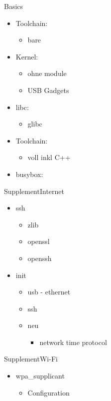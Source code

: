 \begin{frame}{Basics}
 \begin{itemize}
  \item Toolchain: 
  \begin{itemize}
   \item bare
  \end{itemize}
  \item Kernel:
  \begin{itemize}
   \item ohne module
   \item USB Gadgets
  \end{itemize}
  \item libc:
  \begin{itemize}
   \item glibc
  \end{itemize}
  \item Toolchain: 
  \begin{itemize}
   \item voll inkl C++
  \end{itemize}
  \item busybox:
 \end{itemize}
\end{frame}

\begin{frame}{Supplement}{Internet}
 \begin{itemize}
  \item ssh
  \begin{itemize}
   \item zlib
   \item openssl
   \item openssh
  \end{itemize}
  \item init
  \begin{itemize}
   \item usb - ethernet
   \item ssh
   \item {\Large neu} 
   \begin{itemize}
    \item network time protocol
   \end{itemize}
  \end{itemize}
 \end{itemize}
\end{frame}

\begin{frame}{Supplement}{Wi-Fi}
 \begin{itemize}
  \item wpa\_supplicant
  \begin{itemize}
   \item Configuration
  \end{itemize}
 \end{itemize}
\end{frame}

